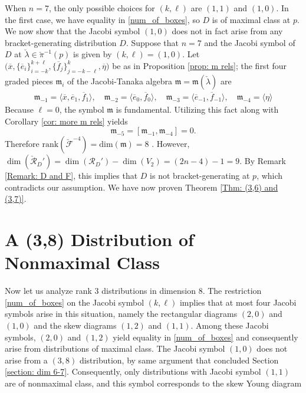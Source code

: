\documentclass[11pt,letterpaper]{amsart}
\numberwithin{equation}{section}
\newcommand{\oline}{\overline}
\begin{document}
When $n=7$, the only possible choices for $(k,\ell)$ are $(1,1)$ and $(1,0)$. In the first case, we have equality in \eqref{num_of_boxes}, so $D$ is of maximal class at $p$. We now show that the Jacobi symbol $(1,0)$ does not in fact arise from any bracket-generating distribution $D$. Suppose that $n=7$ and the Jacobi symbol of $D$ at $\check\lambda\in \check\pi^{-1}(p)$ is given by $(k,\ell)=(1,0)$. Let $\big(\oline x,\{\oline e_i\}_{i=-k}^{k+\ell},\{\oline f_j\}_{j=-k-\ell}^k,\oline \eta\big)$ be as in Proposition \ref{prop: m rels}; the first four graded pieces $\mathfrak{m}_i$ of the Jacobi-Tanaka algebra $\mathfrak{m} = \mathfrak{m}(\check\lambda)$ are
\begin{gather}
    {\mathfrak{m}}_{-1} = \langle \oline x, \oline e_1, \oline f_1\rangle,\quad {\mathfrak{m}}_{-2} =\langle \oline e_0, \oline f_0\rangle,\quad 
    {\mathfrak{m}}_{-3} = \langle \oline e_{-1}, \oline f_{-1}\rangle,\quad {\mathfrak{m}}_{-4}=\langle \eta\rangle
\end{gather}
Because $\ell = 0$, the symbol $\mathfrak m$ is fundamental. Utilizing this fact along with Corollary \ref{cor: more m rels} yields
\begin{equation}
    {\mathfrak{m}}_{-5} = [{\mathfrak{m}}_{-1},{\mathfrak{m}}_{-4}] = 0.
\end{equation}
Therefore $\mathrm{rank}(\check{\mathcal{F}}^{-4}) = \mathrm{dim}(\mathfrak{m}) = 8$ . However, $\dim(\check{\mathcal{R}}_D') = \dim(\mathcal{R}_D')-\dim(V_{2}) = (2n-4)-1 = 9$. By Remark \ref{Remark: D and F}, this implies that $D$ is not bracket-generating at $p$, which contradicts our assumption. We have now proven Theorem \ref{Thm: (3,6) and (3,7)}.

\section{A (3,8) Distribution of Nonmaximal Class}
\label{section: dim 8}

Now let us analyze rank $3$ distributions in dimension $8$. The restriction \eqref{num_of_boxes} on the Jacobi symbol $(k,\ell)$ implies that at most four Jacobi symbols arise in this situation, namely the rectangular diagrams $(2,0)$ and $(1,0)$ and the skew diagrams $(1,2)$ and $(1,1)$. Among these Jacobi symbols, $(2,0)$ and $(1,2)$ yield equality in \eqref{num_of_boxes} and consequently arise from distributions of maximal class. The Jacobi symbol $(1,0)$ does not arise from a $(3,8)$ distribution, by same argument that concluded Section \ref{section: dim 6-7}. Consequently, only distributions with Jacobi symbol $(1,1)$ are of nonmaximal class, and this symbol corresponds to the skew Young diagram
\end{document}
